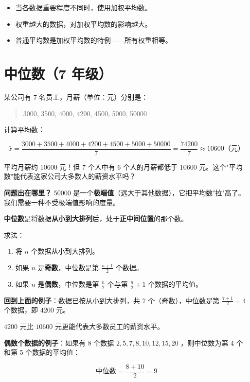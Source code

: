 \begin{keytakeaway}


\begin{itemize}
  \item 当各数据重要程度不同时，使用加权平均数。
  \item 权重越大的数据，对加权平均数的影响越大。
  \item 普通平均数是加权平均数的特例——所有权重相等。
\end{itemize}


\end{keytakeaway}



\section*{中位数（7 年级）}


\begin{explore}


某公司有 7 名员工，月薪（单位：元）分别是：

\end{explore}

\begin{quote}
3000, 3500, 4000, 4200, 4500, 5000, 50000
\end{quote}


计算平均数：

\[
\bar{x} = \frac{3000 + 3500 + 4000 + 4200 + 4500 + 5000 + 50000}{7} = \frac{74200}{7} \approx 10600 \text{（元）}
\]


平均月薪约 10600 元！但 7 个人中有 6 个人的月薪都低于 10600 元。这个"平均数"能代表这家公司大多数人的薪资水平吗？

\textbf{问题出在哪里？} 50000 是一个\textbf{极端值}（远大于其他数据），它把平均数"拉"高了。我们需要一种不受极端值影响的度量。

\begin{understand}


\textbf{中位数}是将数据\textbf{从小到大排列}后，处于\textbf{正中间位置}的那个数。

求法：
\begin{enumerate}
  \item 将 $n$ 个数据从小到大排列。
  \item 如果 $n$ 是\textbf{奇数}，中位数是第 $\frac{n+1}{2}$ 个数据。
  \item 如果 $n$ 是\textbf{偶数}，中位数是第 $\frac{n}{2}$ 个与第 $\frac{n}{2}+1$ 个数据的平均值。
\end{enumerate}


\textbf{回到上面的例子}：数据已按从小到大排列，共 7 个（奇数），中位数是第 $\frac{7+1}{2} = 4$ 个数据，即 $4200$ 元。

$4200$ 元比 $10600$ 元更能代表大多数员工的薪资水平。

\textbf{偶数个数据的例子}：如果有 8 个数据 $2, 5, 7, 8, 10, 12, 15, 20$ ，则中位数为第 4 个和第 5 个数据的平均值：

\[
\text{中位数} = \frac{8 + 10}{2} = 9
\]


\end{understand}

